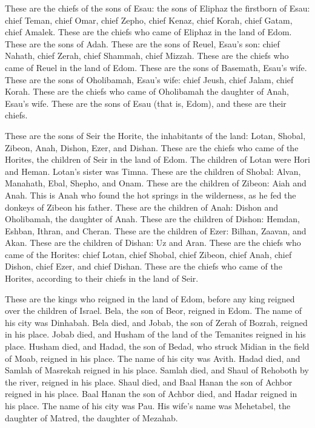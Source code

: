  These are the chiefs of the sons of Esau: the sons of
Eliphaz the firstborn of Esau: chief Teman, chief Omar, chief Zepho,
chief Kenaz,  chief Korah, chief Gatam, chief Amalek. These
are the chiefs who came of Eliphaz in the land of Edom. These are the
sons of Adah.  These are the sons of Reuel, Esau's son:
chief Nahath, chief Zerah, chief Shammah, chief Mizzah. These are the
chiefs who came of Reuel in the land of Edom. These are the sons of
Basemath, Esau's wife.  These are the sons of Oholibamah,
Esau's wife: chief Jeush, chief Jalam, chief Korah. These are the chiefs
who came of Oholibamah the daughter of Anah, Esau's wife. 
These are the sons of Esau (that is, Edom), and these are their chiefs.

 These are the sons of Seir the Horite, the inhabitants of
the land: Lotan, Shobal, Zibeon, Anah,  Dishon, Ezer, and
Dishan. These are the chiefs who came of the Horites, the children of
Seir in the land of Edom.  The children of Lotan were Hori
and Heman. Lotan's sister was Timna.  These are the
children of Shobal: Alvan, Manahath, Ebal, Shepho, and Onam.
 These are the children of Zibeon: Aiah and Anah. This is
Anah who found the hot springs in the wilderness, as he fed the donkeys
of Zibeon his father.  These are the children of Anah:
Dishon and Oholibamah, the daughter of Anah.  These are the
children of Dishon: Hemdan, Eshban, Ithran, and Cheran. 
These are the children of Ezer: Bilhan, Zaavan, and Akan. 
These are the children of Dishan: Uz and Aran.  These are
the chiefs who came of the Horites: chief Lotan, chief Shobal, chief
Zibeon, chief Anah,  chief Dishon, chief Ezer, and chief
Dishan. These are the chiefs who came of the Horites, according to their
chiefs in the land of Seir.

 These are the kings who reigned in the land of Edom,
before any king reigned over the children of Israel.  Bela,
the son of Beor, reigned in Edom. The name of his city was Dinhabah.
 Bela died, and Jobab, the son of Zerah of Bozrah, reigned
in his place.  Jobab died, and Husham of the land of the
Temanites reigned in his place.  Husham died, and Hadad,
the son of Bedad, who struck Midian in the field of Moab, reigned in his
place. The name of his city was Avith.  Hadad died, and
Samlah of Masrekah reigned in his place.  Samlah died, and
Shaul of Rehoboth by the river, reigned in his place. 
Shaul died, and Baal Hanan the son of Achbor reigned in his place.
 Baal Hanan the son of Achbor died, and Hadar reigned in
his place. The name of his city was Pau. His wife's name was Mehetabel,
the daughter of Matred, the daughter of Mezahab.

